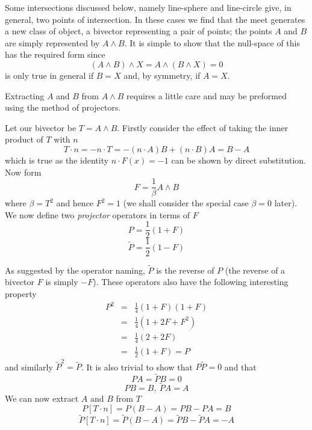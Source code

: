 Some intersections discussed below, namely line-sphere and line-circle give, in general, two points of
intersection. In these cases we find that the meet generates a new class of object, a
bivector representing a pair of points; the points $A$ and $B$ are simply represented
by $A \wedge B$. It is simple to show that the null-space of this has the 
required form since
\[
(A \wedge B) \wedge X = A \wedge (B \wedge X) =  0
\]
is only true in general if $B = X$ and, by symmetry, if $A = X$. 

Extracting $A$ and $B$ from $A \wedge B$ requires a little care and may be preformed 
using the method of projectors.

Let our bivector be $T = A \wedge B$. Firstly consider the effect of taking the
inner product of $T$ with $n$ 
\[
T \cdot n = -n \cdot T = -(n\cdot A)B + (n\cdot B)A = B-A
\]
which is true as the identity $n \cdot F(x) = -1$ can be shown by 
direct substitution. Now form
\[
F = \frac{1}{\beta}A \wedge B
\]
where $\beta = T^2$ and hence $F^2=1$ (we shall consider the special 
case $\beta =0$ later). We now define two \emph{projector} operators in terms of $F$
\[
P = \frac{1}{2}(1 + F)
\]
\[
\tilde{P} = \frac{1}{2}(1 - F)
\]

As suggested by the operator naming, $\tilde{P}$ is the reverse of $P$ (the reverse of a 
bivector $F$ is simply $-F$). These operators also have the following interesting 
property
\begin{eqnarray*}
P^2 & = & \frac{1}{4} (1+F)(1+F) \\
    & = & \frac{1}{4} (1 + 2F + F^2) \\
    & = & \frac{1}{4} (2 + 2F) \\
    & = & \frac{1}{2} (1 + F) = P
\end{eqnarray*}
and similarly $\tilde{P}^2 = \tilde{P}$. It is also trivial to show that $P\tilde{P}=0$ and
that
\[
PA = \tilde{P}B = 0
\]
\[
PB = B, \  \tilde{P}A = A
\]
We can now extract $A$ and $B$ from $T$
\begin{equation}
P \left[ T\cdot n \right] = P (B - A) = PB-PA = B\label{eqn:extractB}
\end{equation}
\begin{equation}
\tilde{P} \left[ T \cdot n \right] = \tilde{P} (B-A) = \tilde{P}B - \tilde{P}A = -A
\label{eqn:extractA}
\end{equation}

